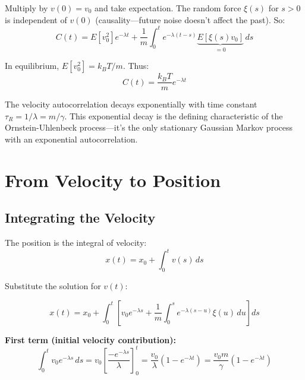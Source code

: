 \documentclass[11pt,a4paper]{article}
\begin{document}
	Multiply by $v(0) = v_0$ and take expectation. The random force $\xi(s)$ for $s > 0$ is independent of $v(0)$ (causality---future noise doesn't affect the past). So:
	\begin{equation}
		C(t) = E[v_0^2] e^{-\lambda t} + \frac{1}{m} \int_0^t e^{-\lambda(t-s)} \underbrace{E[\xi(s) v_0]}_{=0} \, ds
	\end{equation}
	
	In equilibrium, $E[v_0^2] = k_B T / m$. Thus:
	\begin{equation}
		C(t) = \frac{k_B T}{m} e^{-\lambda t}
	\end{equation}
	
	The velocity autocorrelation decays exponentially with time constant $\tau_R = 1/\lambda = m/\gamma$. This exponential decay is the defining characteristic of the Ornstein-Uhlenbeck process---it's the only stationary Gaussian Markov process with an exponential autocorrelation.
	
	\section{From Velocity to Position}
	
	\subsection{Integrating the Velocity}
	
	The position is the integral of velocity:
	\begin{equation}
		x(t) = x_0 + \int_0^t v(s) \, ds
	\end{equation}
	
	Substitute the solution for $v(t)$:
	
	\begin{equation}
		x(t) = x_0 + \int_0^t \left[v_0 e^{-\lambda s} + \frac{1}{m} \int_0^s e^{-\lambda(s-u)} \xi(u) \, du\right] ds
	\end{equation}
	
	\textbf{First term (initial velocity contribution):}
	\begin{equation}
		\int_0^t v_0 e^{-\lambda s} \, ds = v_0 \left[\frac{-e^{-\lambda s}}{\lambda}\right]_0^t = \frac{v_0}{\lambda} \left(1 - e^{-\lambda t}\right) = \frac{v_0 m}{\gamma} \left(1 - e^{-\lambda t}\right)
	\end{equation}
	
\end{document}
